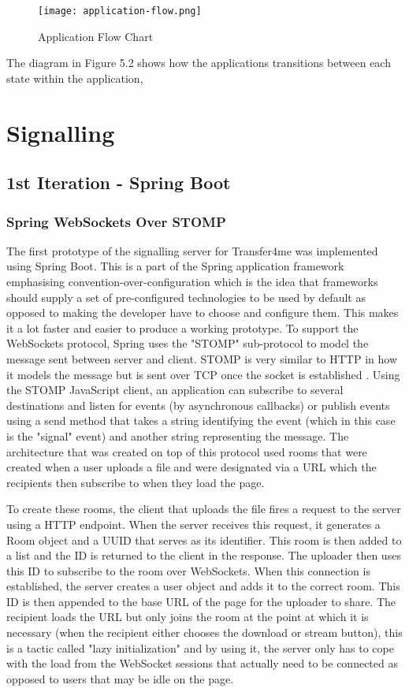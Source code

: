\documentclass[]{report}
\begin{document}
			\begin{figure}[H]
				\caption{Application Flow Chart}
				\centering
				\texttt{[image: application-flow.png]}
			\end{figure}
			
			The diagram in Figure 5.2 shows how the applications transitions between each state within the application, 
		
		\section{Signalling}
			\subsection{1st Iteration - Spring Boot}
				\subsubsection*{Spring WebSockets Over STOMP}
				The first prototype of the signalling server for Transfer4me was implemented using Spring Boot. This is a part of the Spring application framework emphasising convention-over-configuration which is the idea that frameworks should supply a set of pre-configured technologies to be used by default as opposed to making the developer have to choose and configure them. This makes it a lot faster and easier to produce a working prototype. To support the WebSockets protocol, Spring uses the "STOMP" sub-protocol to model the message sent between server and client. STOMP is very similar to HTTP in how it models the message but is sent over TCP once the socket is established . Using the STOMP JavaScript client, an application can subscribe to several destinations and listen for events (by asynchronous callbacks) or publish events using a send method that takes a string identifying the event (which in this case is the "signal" event) and another string representing the message. The architecture that was created on top of this protocol used rooms that were created when a user uploads a file and were designated via a URL which the recipients then subscribe to when they load the page.

				To create these rooms, the client that uploads the file fires a request to the server using a HTTP endpoint. When the server receives this request, it generates a Room object and a UUID that serves as its identifier. This room is then added to a list and the ID is returned to the client in the response. The uploader then uses this ID to subscribe to the room over WebSockets. When this connection is established, the server creates a user object and adds it to the correct room. This ID is then appended to the base URL of the page for the uploader to share. The recipient loads the URL but only joins the room at the point at which it is necessary (when the recipient either chooses the download or stream button), this is a tactic called "lazy initialization" and by using it, the server only has to cope with the load from the WebSocket sessions that actually need to be connected as opposed to users that may be idle on the page.
							
\end{document}
